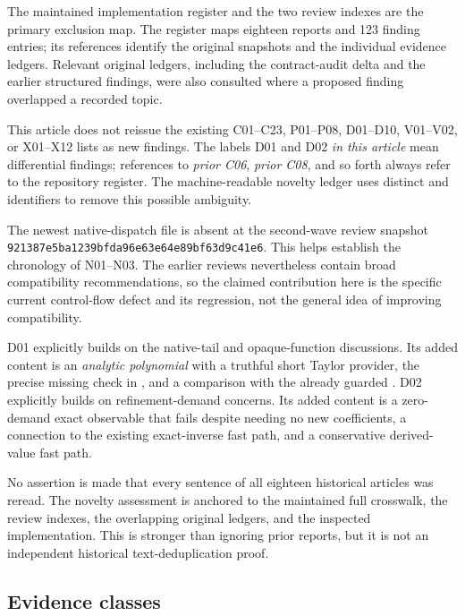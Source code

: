 \documentclass[11pt,letterpaper]{article}
\newcommand{\code}[1]{\texttt{\detokenize{#1}}}
\begin{document}
The maintained implementation register and the two review indexes are the primary exclusion map. The register maps eighteen reports and 123 finding entries; its references identify the original snapshots and the individual evidence ledgers. Relevant original ledgers, including the contract-audit delta and the earlier structured findings, were also consulted where a proposed finding overlapped a recorded topic.\cite{register,reviews,wave2,review11,review4}

This article does not reissue the existing C01--C23, P01--P08, D01--D10, V01--V02, or X01--X12 lists as new findings. The labels D01 and D02 \emph{in this article} mean differential findings; references to \emph{prior C06}, \emph{prior C08}, and so forth always refer to the repository register. The machine-readable novelty ledger uses distinct \code{AUDIT-D01} and \code{AUDIT-D02} identifiers to remove this possible ambiguity.

The newest native-dispatch file is absent at the second-wave review snapshot \nolinkurl{921387e5ba1239bfda96e63e64e89bf63d9c41e6}. This helps establish the chronology of N01--N03. The earlier reviews nevertheless contain broad compatibility recommendations, so the claimed contribution here is the specific current control-flow defect and its regression, not the general idea of improving compatibility.

D01 explicitly builds on the native-tail and opaque-function discussions. Its added content is an \emph{analytic polynomial} with a truthful short Taylor provider, the precise missing check in \code{seriesJetApply}, and a comparison with the already guarded \code{fwdAnalytic}. D02 explicitly builds on refinement-demand concerns. Its added content is a zero-demand exact observable that fails despite needing no new coefficients, a connection to the existing exact-inverse fast path, and a conservative derived-value fast path.

No assertion is made that every sentence of all eighteen historical articles was reread. The novelty assessment is anchored to the maintained full crosswalk, the review indexes, the overlapping original ledgers, and the inspected implementation. This is stronger than ignoring prior reports, but it is not an independent historical text-deduplication proof.

\subsection{Evidence classes}
\end{document}
